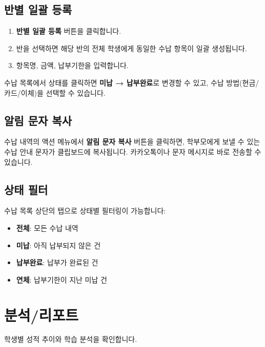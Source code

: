 \documentclass[11pt, a4paper]{article}
\newcommand{\menu}[1]{\textcolor{eduprimary}{\textbf{#1}}}
\newcommand{\btn}[1]{\colorbox{eduprimary!10}{\textcolor{eduprimary}{\textbf{#1}}}}
\begin{document}
\subsection{반별 일괄 등록}

\begin{enumerate}[leftmargin=1.5em]
  \item \btn{반별 일괄 등록} 버튼을 클릭합니다.
  \item 반을 선택하면 해당 반의 전체 학생에게 동일한 수납 항목이 일괄 생성됩니다.
  \item 항목명, 금액, 납부기한을 입력합니다.
\end{enumerate}

\begin{tipbox}
  수납 목록에서 상태를 클릭하면 \textbf{미납 → 납부완료}로 변경할 수 있고, 수납 방법(현금/카드/이체)을 선택할 수 있습니다.
\end{tipbox}

\subsection{알림 문자 복사}

수납 내역의 액션 메뉴에서 \menu{알림 문자 복사} 버튼을 클릭하면, 학부모에게 보낼 수 있는 수납 안내 문자가 클립보드에 복사됩니다. 카카오톡이나 문자 메시지로 바로 전송할 수 있습니다.

\subsection{상태 필터}

수납 목록 상단의 탭으로 상태별 필터링이 가능합니다:
\begin{itemize}[leftmargin=1.5em]
  \item \textbf{전체}: 모든 수납 내역
  \item \textbf{미납}: 아직 납부되지 않은 건
  \item \textbf{납부완료}: 납부가 완료된 건
  \item \textbf{연체}: 납부기한이 지난 미납 건
\end{itemize}


\section{분석/리포트}

학생별 성적 추이와 학습 분석을 확인합니다.
\end{document}
